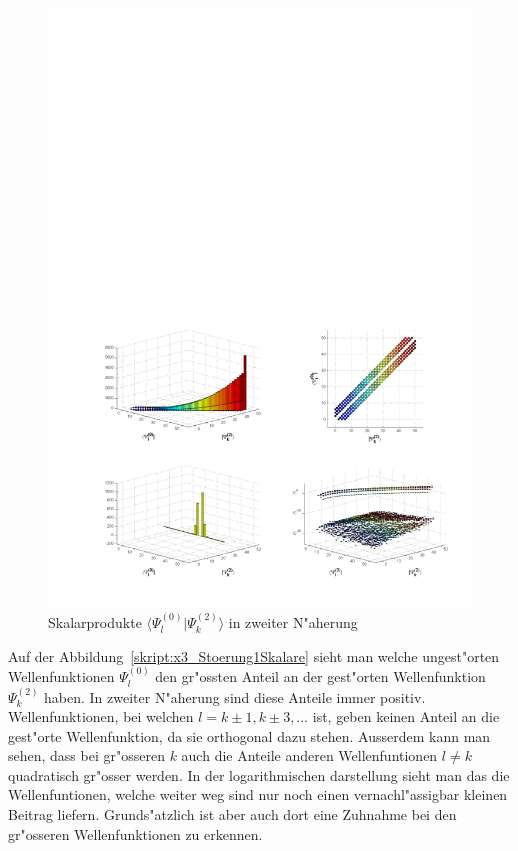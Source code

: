 \begin{refsection}
\begin{figure}	%
\centering
\includegraphics[width=1.0\textwidth]{anharmonisch/images/x3/Stoerung2Skalare.pdf}
\caption{Skalarprodukte $\langle\Psi_l^{(0)}|\Psi_k^{(2)}\rangle$ in zweiter N"aherung
\label{skript:x3_Stoerung2Skalare}}
\end{figure}

Auf der Abbildung~\ref{skript:x3_Stoerung1Skalare} sieht man welche ungest"orten Wellenfunktionen $\Psi_l^{(0)}$ den gr"ossten Anteil an der gest"orten Wellenfunktion $\Psi_k^{(2)}$ haben. In zweiter N"aherung sind diese Anteile immer positiv.  Wellenfunktionen, bei welchen $l=k\pm 1,k\pm 3,\dots$ ist, geben keinen Anteil an die gest"orte Wellenfunktion, da sie orthogonal dazu stehen. Ausserdem kann man sehen, dass bei gr"osseren $k$ auch die Anteile anderen Wellenfuntionen $l\neq k$ quadratisch gr"osser werden. In der logarithmischen darstellung sieht man das die Wellenfuntionen, welche weiter weg sind nur noch einen vernachl"assigbar kleinen Beitrag liefern. Grunds"atzlich ist aber auch dort eine Zuhnahme bei den gr"osseren Wellenfunktionen zu erkennen.

\printbibliography[heading=subbibliography]
\end{refsection}

